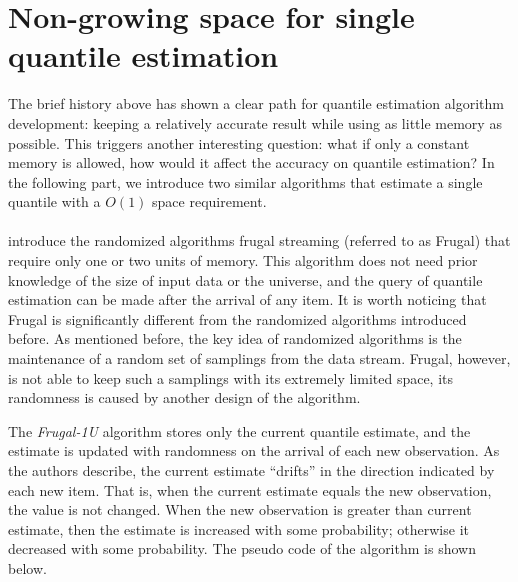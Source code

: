 

\section{Non-growing space for single quantile estimation}
\label{singlequantile}
The brief history above has shown a clear path for quantile estimation algorithm development: keeping a relatively accurate result while using as little memory as possible. This triggers another interesting question: what if only a constant memory is allowed, how would it affect the accuracy on quantile estimation? In the following part, we introduce two similar algorithms that estimate a single quantile with a $O(1)$ space requirement.
\\\\
\citeauthor{maFrugalStreamingEstimating2014}\cite{maFrugalStreamingEstimating2014} introduce the randomized algorithms frugal streaming (referred to as Frugal) that require only one or two units of memory. This algorithm does not need prior knowledge of the size of input data or the universe, and the query of quantile estimation can be made after the arrival of any item.
It is worth noticing that Frugal is significantly different from the randomized algorithms introduced before.
As mentioned before, the key idea of randomized algorithms is the maintenance of a random set of samplings from the data stream. Frugal, however, is not able to keep such a samplings with its extremely limited space, its randomness is caused by another design of the algorithm.

The \textit{Frugal-1U} algorithm stores only the current quantile estimate, and the estimate is updated with randomness on the arrival of each new observation. As the authors describe, the current estimate ``drifts'' in the direction indicated by each new item\cite{maFrugalStreamingEstimating2014}. That is, when the current estimate equals the new observation, the value is not changed. When the new observation is greater than current estimate, then the estimate is increased with some probability; otherwise it decreased with some probability.
The pseudo code of the algorithm is shown below.

